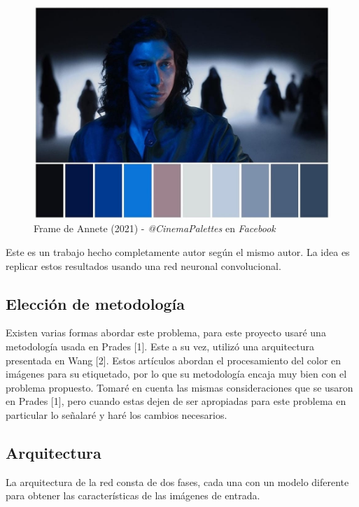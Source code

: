 \documentclass[14pt,a4paper]{report}
\begin{document}
\begin{figure}[h]
  \centering
\includegraphics[scale=0.4]{../paleta-colores.jpg} 
  \caption{Frame de Annete (2021) - \textit{@CinemaPalettes} en \textit{Facebook}}
  \label{fig:neural-network}
\end{figure}

Este es un trabajo hecho completamente autor según el mismo autor. La idea es replicar estos resultados usando una red neuronal convolucional.

\subsection*{Elección de metodología}

Existen varias formas abordar este problema, para este proyecto usaré una metodología usada en Prades [1]. Este a su vez, utilizó una arquitectura presentada en Wang [2]. Estos artículos abordan el procesamiento del color en imágenes para su etiquetado, por lo que su metodología encaja muy bien con el problema propuesto. Tomaré en cuenta las mismas consideraciones que se usaron en Prades [1], pero cuando estas dejen de ser apropiadas para este problema en particular lo señalaré y haré los cambios necesarios.

\subsection*{Arquitectura}

La arquitectura de la red consta de dos fases, cada una con un modelo diferente para obtener las características de las imágenes de entrada.
\end{document}
